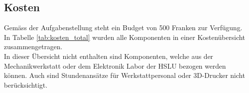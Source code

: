 \documentclass[../../main.tex]{subfiles}
\begin{document}
\begin{comment}
    Schlussdiskussion mit
    - Entwicklungskosten, zeitlicher Entwicklungsaufwand
    - Erfahrungen, „Lessons learned“, kritische Würdigung der Arbeiten
    - offene Punkte, Risiken und Ausblick 
\end{comment}

\subsection{Kosten}
Gemäss der Aufgabenstellung steht ein Budget von 500 Franken zur Verfügung. In Tabelle \ref{tab:kosten_total} wurden alle Komponenten in einer Kostenübersicht zusammengetragen.\\
In dieser Übersicht nicht enthalten sind Komponenten, welche aus der Mechanikwerkstatt oder dem Elektronik Labor der
HSLU bezogen werden können. Auch sind Stundenansätze für Werkstattpersonal oder 3D-Drucker nicht berücksichtigt. \\
\end{document}
